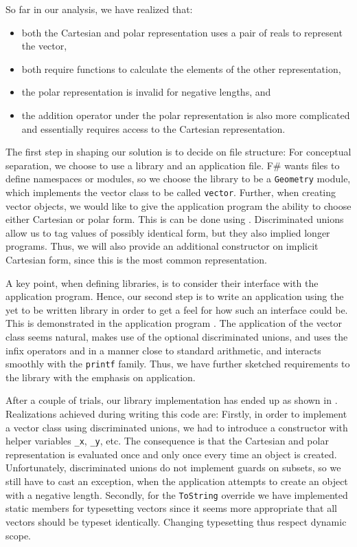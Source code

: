 So far in our analysis, we have realized that:
\begin{itemize}
\item both the Cartesian and polar representation uses a pair of reals to represent the vector, 
\item both require functions to calculate the elements of the other representation, 
\item the polar representation is invalid for negative lengths, and
\item the addition operator under the polar representation is also more complicated and essentially requires access to the Cartesian representation.
\end{itemize}
 

The first step in shaping our solution is to decide on file structure: For conceptual separation, we choose to use a library and an application file. F\# wants files to define namespaces or modules, so we choose the library to be a \lstinline{Geometry} module, which implements the vector class to be called \lstinline{vector}. Further, when creating vector objects, we would like to give the application program the ability to choose either Cartesian or polar form. This is can be done using . Discriminated unions allow us to tag values of possibly identical form, but they also implied longer programs. Thus, we will also provide an additional constructor on implicit Cartesian form, since this is the most common representation.

A key point, when defining libraries, is to consider their interface with the application program. Hence, our second step is to write an application using the yet to be written library in order to get a feel for how such an interface could be. This is demonstrated in the application program .
%
%
The application of the vector class seems natural, makes use of the optional discriminated unions, and uses the infix operators \lexeme{+} and \lexeme{*} in a manner close to standard arithmetic, and interacts smoothly with the \lstinline{printf} family. Thus, we have further sketched requirements to the library with the emphasis on application.

After a couple of trials, our library implementation has ended up as shown in .
%
%
Realizations achieved during writing this code are: Firstly, in order to implement a vector class using discriminated unions, we had to introduce a constructor with helper variables \lstinline{_x}, \lstinline{_y}, etc. The consequence is that the Cartesian and polar representation is evaluated once and only once every time an object is created. Unfortunately, discriminated unions do not implement guards on subsets, so we still have to cast an exception, when the application attempts to create an object with a negative length. Secondly, for the \lstinline{ToString} override we have implemented static members for typesetting vectors since it seems more appropriate that all vectors should be typeset identically. Changing typesetting thus respect dynamic scope.

